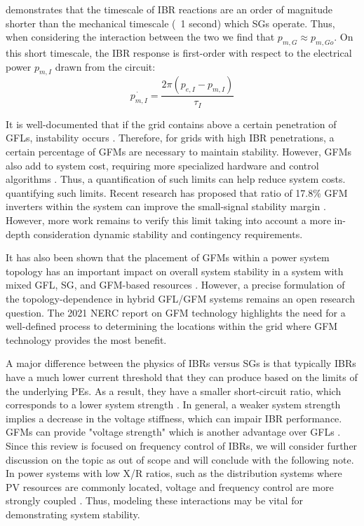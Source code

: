 \cite{kenyon_interactive_2023} demonstrates that the timescale of IBR reactions
are an order of magnitude
shorter than the mechanical timescale (~1 second) which SGs operate.
Thus, when considering the interaction between the two we find that 
$p_{m,G} \approx p_{m,Go}$.
On this short timescale, the IBR response is first-order with respect to the
electrical power $p_{m,I}$ drawn from the circuit:
\begin{equation}
  \dot{p_{m,I}} = \frac{2 \pi (p_{e,I} - p_{m,I})}{\tau_I}
\end{equation}

It is well-documented that if the grid contains above a certain penetration
of GFLs, instability occurs \cite{kenyon_stability_2020}. Therefore, for grids with high
IBR penetrations, a certain percentage of GFMs are necessary to maintain
stability. However, GFMs also add to system cost, requiring more specialized
hardware and control algorithms \cite{noauthor_grid_2021}. Thus,
a quantification of such limits can help reduce system costs.
quantifying such limits. Recent research has proposed that ratio of 17.8\%
GFM inverters within the system can improve the small-signal stability margin
\cite{xin_how_2023}. However, more work remains to verify this
limit taking into account a more in-depth consideration dynamic stability
and contingency requirements.

It has also been shown that the placement of GFMs within a power system
topology has an important impact on overall system stability in a 
system with mixed GFL, SG, and GFM-based resources \cite{kenyon_stability_2020}.
However, a precise formulation of the topology-dependence in hybrid GFL/GFM
systems remains an open research question. The 2021 NERC report on GFM technology
highlights the need for a well-defined process to determining the locations
within the grid where GFM technology provides the most benefit.

A major difference between the physics of IBRs versus SGs is that
typically IBRs have a much lower current threshold that they
can produce based on the limits of the underlying PEs. As a result,
they have a smaller short-circuit ratio, which corresponds to 
a lower system strength \cite{kenyon_stability_2020}.
In general, a weaker system strength implies a decrease in the voltage stiffness,
which can impair IBR performance. GFMs can provide "voltage strength" which is another
advantage over GFLs \cite{xin_how_2023}. Since this review is focused on frequency
control of IBRs, we will consider further discussion on the topic
as out of scope and will conclude with the following note. In power systems with
low X/R ratios, such as the distribution systems where PV resources are commonly
located, voltage and frequency control are more strongly coupled \cite{anttila_grid_2022}.
Thus, modeling these interactions may be vital for demonstrating system stability.